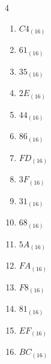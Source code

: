 \begin{multicols}{4}
\begin{enumerate}
  \item $C4_{(16)}$

        \phantom{$=196$}

  \item $61_{(16)}$

        \phantom{$=97$}

  \item $35_{(16)}$

        \phantom{$=53$}

  \item $2E_{(16)}$

        \phantom{$=46$}

  \item $44_{(16)}$

        \phantom{$=68$}

  \item $86_{(16)}$

        \phantom{$=134$}

  \item $FD_{(16)}$

        \phantom{$=253$}

  \item $3F_{(16)}$

        \phantom{$=63$}

  \item $31_{(16)}$

        \phantom{$=49$}

  \item $68_{(16)}$

        \phantom{$=104$}

  \item $5A_{(16)}$

        \phantom{$=90$}

  \item $FA_{(16)}$

        \phantom{$=250$}

\columnbreak %

  \item $F8_{(16)}$

        \phantom{$=248$}

  \item $81_{(16)}$

        \phantom{$=129$}

  \item $EF_{(16)}$

        \phantom{$=239$}

  \item $BC_{(16)}$


\end{enumerate}
\end{multicols}
